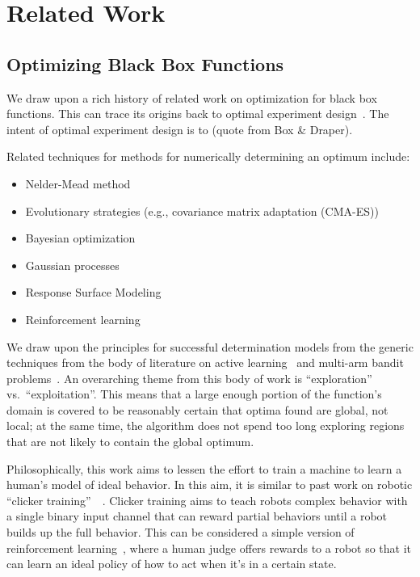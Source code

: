 \section{Related Work}

\subsection{Optimizing Black Box Functions}

We draw upon a rich history of related work on optimization for black box functions.
This can trace its origins back to optimal experiment design~\cite{box}.
The intent of optimal experiment design is to (quote from Box \& Draper).

Related techniques for methods for numerically determining an optimum include:
\begin{itemize}
  \item Nelder-Mead method~\cite{nelder}
  \item Evolutionary strategies (e.g., covariance matrix adaptation (CMA-ES))~\cite{cma}
  \item Bayesian optimization~\cite{brochu_tutorial_2010}
  \item Gaussian processes~\cite{gaussian}
  \item Response Surface Modeling~\cite{box}
  \item Reinforcement learning~\cite{reinforcement}
\end{itemize}

We draw upon the principles for successful determination models from the generic techniques from the body of literature on active learning~\cite{al} and multi-arm bandit problems~\cite{multi-armed}.
An overarching theme from this body of work is ``exploration'' vs.\ ``exploitation''.
This means that a large enough portion of the function's domain is covered to be reasonably certain that optima found are global, not local;
at the same time, the algorithm does not spend too long exploring regions that are not likely to contain the global optimum.

Philosophically, this work aims to lessen the effort to train a machine to learn a human's model of ideal behavior.
In this aim, it is similar to past work on robotic ``clicker training''~\cite{clicker_1}~\cite{clicker_2}.
Clicker training aims to teach robots complex behavior with a single binary input channel that can reward partial behaviors until a robot builds up the full behavior.
This can be considered a simple version of reinforcement learning~\cite{reinforcement}, where a human judge offers rewards to a robot so that it can learn an ideal policy of how to act when it's in a certain state.


